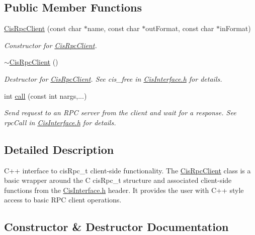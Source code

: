 \subsection*{Public Member Functions}
\begin{DoxyCompactItemize}
\item 
\mbox{\hyperlink{classCisRpcClient_a02fb4a473e586bb441524365f976cc02}{Cis\+Rpc\+Client}} (const char $\ast$name, const char $\ast$out\+Format, const char $\ast$in\+Format)
\begin{DoxyCompactList}\small\item\em Constructor for \mbox{\hyperlink{classCisRpcClient}{Cis\+Rpc\+Client}}. \end{DoxyCompactList}\item 
\mbox{\label{classCisRpcClient_a58598885fe23f219ab5d1b9f74ee1d6f}} 
\mbox{\hyperlink{classCisRpcClient_a58598885fe23f219ab5d1b9f74ee1d6f}{$\sim$\+Cis\+Rpc\+Client}} ()
\begin{DoxyCompactList}\small\item\em Destructor for \mbox{\hyperlink{classCisRpcClient}{Cis\+Rpc\+Client}}. See cis\+\_\+free in \mbox{\hyperlink{CisInterface_8h_source}{Cis\+Interface.\+h}} for details. \end{DoxyCompactList}\item 
int \mbox{\hyperlink{classCisRpcClient_a2378157bcfdde78aef3f8a0068daec39}{call}} (const int nargs,...)
\begin{DoxyCompactList}\small\item\em Send request to an R\+PC server from the client and wait for a response. See rpc\+Call in \mbox{\hyperlink{CisInterface_8h_source}{Cis\+Interface.\+h}} for details. \end{DoxyCompactList}\end{DoxyCompactItemize}


\subsection{Detailed Description}
C++ interface to cis\+Rpc\+\_\+t client-\/side functionality. The \mbox{\hyperlink{classCisRpcClient}{Cis\+Rpc\+Client}} class is a basic wrapper around the C cis\+Rpc\+\_\+t structure and associated client-\/side functions from the \mbox{\hyperlink{CisInterface_8h_source}{Cis\+Interface.\+h}} header. It provides the user with C++ style access to basic R\+PC client operations. 

\subsection{Constructor \& Destructor Documentation}
\mbox{\label{classCisRpcClient_a02fb4a473e586bb441524365f976cc02}} 
